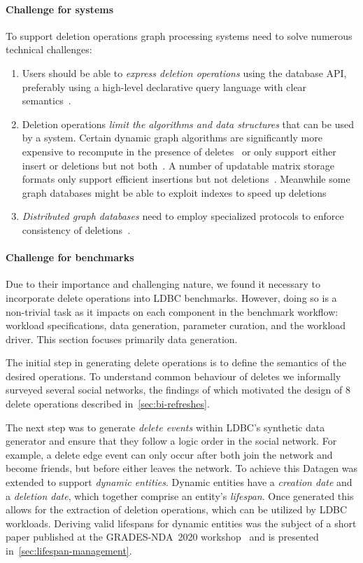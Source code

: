 \paragraph{Challenge for systems}
To support deletion operations graph processing systems need to solve numerous technical challenges:
%
\begin{enumerate}
\item Users should be able to \emph{express deletion operations} using the database API, preferably using a high-level declarative query language with clear semantics~\cite{Green2019}.
\item Deletion operations \emph{limit the algorithms and data structures} that can be used by a system. Certain dynamic graph algorithms are significantly more expensive to recompute in the presence of deletes~\cite{DBLP:conf/soda/Roditty13} or only support either insert or deletions but not both~\cite{DBLP:conf/esa/RodittyZ04}. A number of updatable matrix storage formats only support efficient insertions but not deletions~\cite{DBLP:conf/hpec/BusatoGBB18}. Meanwhile some graph databases might be able to exploit indexes to speed up deletions~\cite[Sec.~4.4.2]{Besta2019}
\item \emph{Distributed graph databases} need to employ specialized protocols to enforce consistency of deletions~\cite{Waudby2020}.
\end{enumerate}

\paragraph{Challenge for benchmarks}
Due to their importance and challenging nature, we found it necessary to incorporate delete operations into LDBC benchmarks.
However, doing so is a non-trivial task as it impacts on each component in the benchmark workflow:
workload specifications, data generation, parameter curation, and the workload driver.
This section focuses primarily data generation.

The initial step in generating delete operations is to define the semantics of the desired operations.
To understand common behaviour of deletes we informally surveyed several social networks, the findings of which motivated the design
of 8 delete operations described in~\autoref{sec:bi-refreshes}.

The next step was to generate \emph{delete events} within LDBC's synthetic data generator and ensure that they follow a logic order in
the social network.
For example, a delete \tKnows edge event can only occur after both \tPersons join the network and become friends,
but before either \tPerson leaves the network.
To achieve this Datagen was extended to support \emph{dynamic entities}.
Dynamic entities have a \emph{creation date} and a \emph{deletion date}, which together comprise an entity's \emph{lifespan}.
Once generated this allows for the extraction of deletion operations, which can be utilized by LDBC workloads.
Deriving valid lifespans for dynamic entities was the subject of a short paper published at the GRADES-NDA~2020
workshop~\cite{DBLP:conf/sigmod/WaudbySPS20} and is presented in~\autoref{sec:lifespan-management}.

